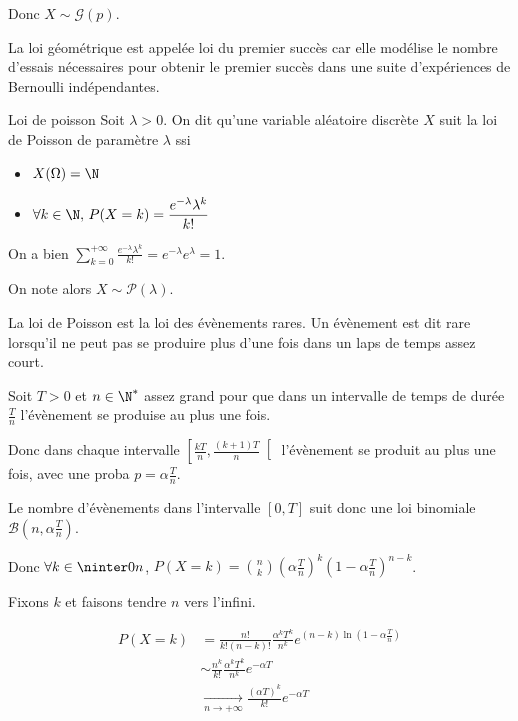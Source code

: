 Donc $X \sim \mathcal G(p)$.

La loi géométrique est appelée loi du premier succès car elle modélise le nombre d'essais nécessaires pour obtenir le premier succès
dans une suite d'expériences de Bernoulli indépendantes.

\begin{definition}{Loi de poisson }{}
    Soit $\lambda > 0$. On dit qu'une variable aléatoire discrète $X$ suit la loi de 
    Poisson de paramètre $\lambda$ ssi 
    \begin{itemize}
        \item $X(\Omega) = \N$
        \item $\displaystyle \forall k \in \N, \, P(X = k) = \frac{e^{- \lambda} \lambda^k}{k!}$
    \end{itemize}

    On a bien $\displaystyle \sum_{k = 0}^{+ \infty} \frac{e^{- \lambda} \lambda^k}{k!} = e^{- \lambda} e^{\lambda} = 1$.

    On note alors $X \sim \mathcal P(\lambda)$.
\end{definition}


La loi de Poisson est la loi des évènements rares. Un évènement est dit rare lorsqu'il ne peut pas se produire 
plus d'une fois dans un laps de temps assez court. 

Soit $T > 0$ et $n \in \N^*$ assez grand pour que dans un intervalle de temps de durée 
$\frac T n$ l'évènement se produise au plus une fois. 

Donc dans chaque intervalle $\left[ \frac{kT} n, \frac{(k + 1)T}{n} \right[$ l'évènement se produit au plus
une fois, avec une proba $p = \alpha \frac T n$. 

Le nombre d'évènements dans l'intervalle $[0, T]$ suit donc une loi 
binomiale $\mathcal B\left( n, \alpha \frac T n \right)$.

Donc $\displaystyle \forall k \in \ninter 0 n$, $P(X = k) = \binom n k \left( \alpha \frac T n \right)^k \left( 1 - \alpha \frac T n \right)^{n - k}$.

Fixons $k$ et faisons tendre $n$ vers l'infini.

\begin{align}
    P(X = k ) & = \frac{n!}{k! (n - k)!} \frac{\alpha^k T^k}{n^k} e^{(n - k) \ln \left( 1 - \alpha \frac T n \right)} \\
    & \sim \frac{n^k}{k!} \frac{\alpha^k T^k}{n^k} e^{- \alpha T} \\
    & \xrightarrow[n \to + \infty]{} \frac{(\alpha T)^k}{k!} e^{- \alpha T}
\end{align}

